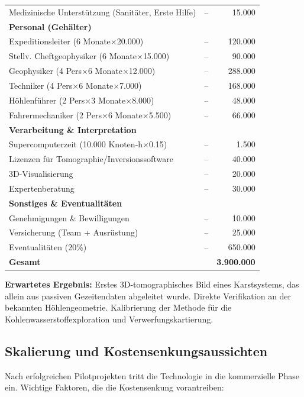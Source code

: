 \documentclass[12pt,a4paper]{article}
\theoremstyle{remark}
\begin{document}
\begin{table}[htbp]
\begin{tabular}{lrr}
			Medizinische Unterstützung (Sanitäter, Erste Hilfe) & – & 15.000 \\
			\multicolumn{3}{l}{\textbf{Personal (Gehälter)}} \\
			Expeditionsleiter (6 Monate$\times$20.000) & – & 120.000 \\
			Stellv. Cheftgeophysiker (6 Monate$\times$15.000) & – & 90.000 \\
			Geophysiker (4 Pers$\times$6 Monate$\times$12.000) & – & 288.000 \\
			Techniker (4 Pers$\times$6 Monate$\times$7.000) & – & 168.000 \\
			Höhlenführer (2 Pers$\times$3 Monate$\times$8.000) & – & 48.000 \\
			Fahrermechaniker (2 Pers$\times$6 Monate$\times$5.500) & – & 66.000 \\
			\multicolumn{3}{l}{\textbf{Verarbeitung \& Interpretation}} \\
			Supercomputerzeit (10.000 Knoten‑h$\times$0.15) & – & 1.500 \\
			Lizenzen für Tomographie/Inversionssoftware & – & 40.000 \\
			3D-Visualisierung & – & 20.000 \\
			Expertenberatung & – & 30.000 \\
			\multicolumn{3}{l}{\textbf{Sonstiges \& Eventualitäten}} \\
			Genehmigungen \& Bewilligungen & – & 10.000 \\
			Versicherung (Team + Ausrüstung) & – & 25.000 \\
			Eventualitäten (20\%) & – & 650.000 \\
			\midrule
			\textbf{Gesamt} & & \textbf{3.900.000} \\
			\bottomrule
		\end{tabular}
	\end{table}
	
	\textbf{Erwartetes Ergebnis:} Erstes 3D-tomographisches Bild eines Karstsystems, das allein aus passiven Gezeitendaten abgeleitet wurde. Direkte Verifikation an der bekannten Höhlengeometrie. Kalibrierung der Methode für die Kohlenwasserstoffexploration und Verwerfungskartierung.
	
	\subsection{Skalierung und Kostensenkungsaussichten}
	
	Nach erfolgreichen Pilotprojekten tritt die Technologie in die kommerzielle Phase ein. Wichtige Faktoren, die die Kostensenkung vorantreiben:
	
\end{document}
